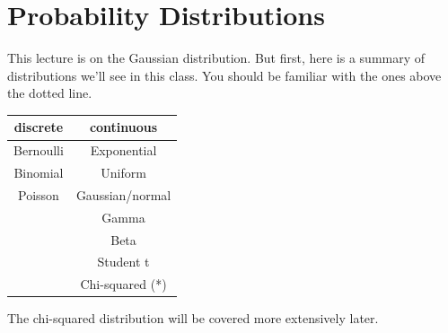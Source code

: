 \documentclass[11pt]{article}
\begin{document}



\section{Probability Distributions}

This lecture is on the Gaussian distribution. But first, here is a summary of distributions we'll see in this class. You should be familiar with the ones above the dotted line.
\begin{center}
\begin{tabular}{ c|c } 
 discrete& continuous   \\  
 \hline
Bernoulli & Exponential   \\ 
Binomial & Uniform\\
Poisson & Gaussian/normal\\
\hdashline %
& Gamma\\
& Beta\\
& Student t\\
& Chi-squared (*) 
\end{tabular}
\end{center}
The chi-squared distribution will be covered more extensively later.
\end{document}
